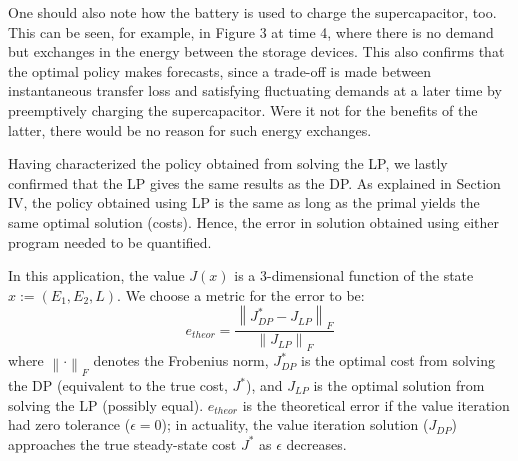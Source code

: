 \documentclass[conference]{IEEEtran}
\newcommand{\norm}[1]{\left\lVert#1\right\rVert}
\begin{document}
One should also note how the battery is used to charge the supercapacitor, too. This can be seen, for example, in Figure 3 at time 4, where there is no demand but exchanges in the energy between the storage devices. This also confirms that the optimal policy makes forecasts, since a trade-off is made between instantaneous transfer loss and satisfying fluctuating demands at a later time by preemptively charging the supercapacitor. Were it not for the benefits of the latter, there would be no reason for such energy exchanges.

Having characterized the policy obtained from solving the LP, we lastly confirmed that the LP gives the same results as the DP. As explained in Section IV, the policy obtained using LP is the same as long as the primal yields the same optimal solution (costs). Hence, the error in solution obtained using either program needed to be quantified.

In this application, the value $J(x)$ is a 3-dimensional function of the state $x:=(E_{1},E_{2},L)$. We choose a metric for the error to be:
\begin{displaymath}
    e_{theor}=\frac{\norm{J^{*}_{DP}-J_{LP}}_{F}}{\norm{J_{LP}}_{F}}
\end{displaymath} where $\norm{\cdot}_{F}$ denotes the Frobenius norm, $J^{*}_{DP}$ is the optimal cost from solving the DP (equivalent to the true cost, $J^{*}$), and $J_{LP}$ is the optimal solution from solving the LP (possibly equal). $e_{theor}$ is the theoretical error if the value iteration had zero tolerance ($\epsilon=0$); in actuality, the value iteration solution ($J_{DP}$) approaches the true steady-state cost $J^{*}$ as $\epsilon$ decreases.
\end{document}
